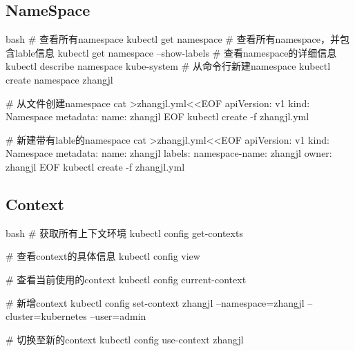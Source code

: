 \subsection{NameSpace}
\begin{code-block}{bash}
# 查看所有namespace
kubectl get namespace
# 查看所有namespace，并包含lable信息
kubectl get namespace --show-labels
# 查看namespace的详细信息
kubectl describe namespace kube-system
# 从命令行新建namespace
kubectl create namespace zhangjl

# 从文件创建namespace
cat >zhangjl.yml<<EOF
apiVersion: v1
kind: Namespace
metadata:
  name: zhangjl
EOF
kubectl create -f zhangjl.yml

# 新建带有lable的namespace
cat >zhangjl.yml<<EOF
apiVersion: v1
kind: Namespace
metadata:
  name: zhangjl
  labels:
    namespace-name: zhangjl
    owner: zhangjl
EOF
kubectl create -f zhangjl.yml
\end{code-block}

\subsection{Context}
\begin{code-block}{bash}
# 获取所有上下文环境
kubectl config get-contexts

# 查看context的具体信息
kubectl config view

# 查看当前使用的context
kubectl config current-context

# 新增context
kubectl config set-context zhangjl --namespace=zhangjl --cluster=kubernetes --user=admin

# 切换至新的context
kubectl config use-context zhangjl

\end{code-block}

